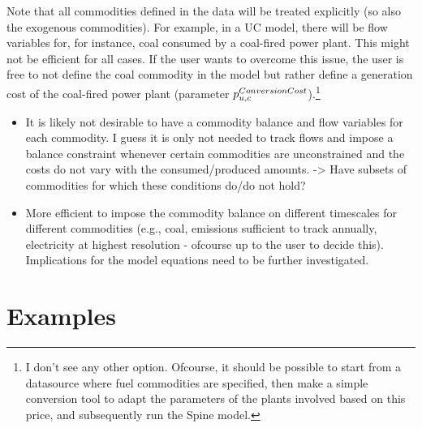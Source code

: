 \documentclass[10pt,english]{article}
\begin{document}
Note that all commodities defined in the data will be treated explicitly (so also the exogenous commodities). For example, in a UC model, there will be flow variables for, for instance, coal consumed by a coal-fired power plant. This might not be efficient for all cases. If the user wants to overcome this issue, the user is free to not define the coal commodity in the model but rather define a generation cost of the coal-fired power plant (parameter $p^{ConversionCost}_{u,c}$).\footnote{I don't see any other option. Ofcourse, it should be possible to start from a datasource where fuel commodities are specified, then make a simple conversion tool to adapt the parameters of the plants involved based on this price, and subsequently run the Spine model.} 



{\color{red}
\begin{itemize}
\item It is likely not desirable to have a commodity balance and flow variables for each commodity. I guess it is only not needed to track flows and impose a balance constraint whenever certain commodities are unconstrained and the costs do not vary with the consumed/produced amounts. -> Have subsets of commodities for which these conditions do/do not hold?
\item More efficient to impose the commodity balance on different timescales for different commodities (e.g., coal, emissions sufficient to track annually, electricity at highest resolution - ofcourse up to the user to decide this). Implications for the model equations need to be further investigated. 
\end{itemize}
}
























\section{Examples}
\end{document}
